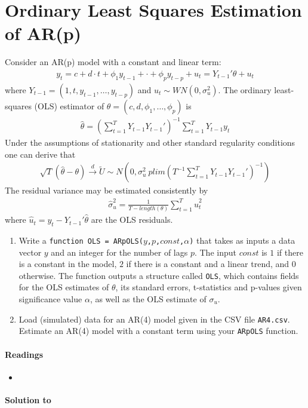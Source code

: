 \section[Ordinary Least Squares Estimation of AR{(p)}]{Ordinary Least Squares Estimation of AR{(p)}\label{ex:OrdinaryLeastSquaresEstimationARp}}
Consider an AR{(p)} model with a constant and linear term:
\begin{align*}
y_t = c + d\cdot t + \phi_1 y_{t-1} +\cdot + \phi_p y_{t-p} +u_{t}=Y_{t-1}'\theta + u_t
\end{align*}
  where \(Y_{t-1}=(1,t,y_{t-1},\ldots,y_{t-p})\) and \(u_t\sim WN(0,\sigma_u^2)\).
The ordinary least-squares (OLS) estimator of \(\theta = (c,d,\phi_1,\ldots,\phi_p)\) is
\begin{align*}
\hat{\theta} = {\left(\sum_{t=1}^T Y_{t-1}Y_{t-1}'\right)}^{-1}\sum_{t=1}^T Y_{t-1} y_t    
\end{align*}
Under the assumptions of stationarity and other standard regularity conditions one can derive that
\begin{align*}
\sqrt{T} (\hat{\theta}-\theta) \overset{d}{\rightarrow} \tilde{U} \sim N\left(0,\sigma_u^2~{plim}{\left(T^{-1}\sum_{t=1}^T Y_{t-1}Y_{t-1}'\right)}^{-1}\right)
\end{align*}
The residual variance may be estimated consistently by
\begin{align*}
\hat{\sigma}_u^2 = \frac{1}{T-length(\theta)}\sum_{t=1}^T\hat{u}_t^2
\end{align*}
where \(\hat{u}_t=y_t -Y_{t-1}'\hat{\theta}\) are the OLS residuals.

\begin{enumerate}
\item
Write a \texttt{function OLS = ARpOLS{(\(y\),\(p\),\(const\),\(\alpha \))}}
  that takes as inputs a data vector \(y\) and an integer for the number of lags \(p\).
The input \(const\) is \(1\) if there is a constant in the model,
  \(2\) if there is a constant and a linear trend,
  and \(0\) otherwise.
The function outputs a structure called \texttt{OLS},
  which contains fields for the OLS estimates of \(\theta \),
  its standard errors, t-statistics and p-values given significance value \(\alpha \),
  as well as the OLS estimate of \(\sigma_u\).
\item
Load (simulated) data for an AR{(4)} model given in the CSV file \texttt{AR4.csv}.
Estimate an AR{(4)} model with a constant term using your \texttt{ARpOLS} function.
\end{enumerate}

\paragraph{Readings}
\begin{itemize}
\item \textcite{Lutkepohl_2004_UnivariateTimeSeries}
\end{itemize}


\begin{solution}\textbf{Solution to }
\ifDisplaySolutions%

\fi
\newpage
\end{solution}